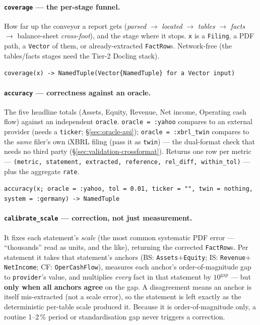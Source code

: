 \documentclass[11pt,a4paper]{report}
\newcommand{\sig}[1]{\medskip\noindent\texttt{#1}\par\medskip}
\begin{document}
\paragraph{\texttt{coverage} --- the per-stage funnel.} How far up the conveyor a report gets
(\emph{parsed} $\to$ \emph{located} $\to$ \emph{tables} $\to$ \emph{facts} $\to$ balance-sheet
\emph{cross-foot}), and the stage where it stops. \texttt{x} is a \texttt{Filing}, a PDF path, a
\texttt{Vector} of them, or already-extracted \texttt{FactRow}s. Network-free (the tables/facts stages need
the Tier-2 Docling stack).

\sig{coverage(x) -> NamedTuple\quad(\texttt{Vector\{NamedTuple\}} for a \texttt{Vector} input)}

\paragraph{\texttt{accuracy} --- correctness against an oracle.} The five headline totals (Assets, Equity,
Revenue, Net income, Operating cash flow) against an independent \texttt{oracle}. \texttt{oracle = :yahoo}
compares to an external provider (needs a \texttt{ticker}; \S\ref{sec:oracle-api}); \texttt{oracle =
:xbrl\_twin} compares to the \emph{same} filer's own iXBRL filing (pass it as \texttt{twin}) --- the
dual-format check that needs no third party (\S\ref{sec:validation-crossformat}). Returns one row per metric
--- \texttt{(metric, statement, extracted, reference, rel\_diff, within\_tol)} --- plus the aggregate
\texttt{rate}.

\sig{accuracy(x; oracle = :yahoo, tol = 0.01, ticker = "", twin = nothing, system = :germany) -> NamedTuple}

\paragraph{\texttt{calibrate\_scale} --- correction, not just measurement.} It fixes each statement's
\emph{scale} (the most common systematic PDF error --- ``thousands'' read as units, and the like), returning
the corrected \texttt{FactRow}s. Per statement it takes that statement's anchors (BS:
\texttt{Assets}$+$\texttt{Equity}; IS: \texttt{Revenue}$+$\texttt{NetIncome}; CF: \texttt{OperCashFlow}),
measures each anchor's order-of-magnitude gap to \texttt{provider}'s value, and multiplies \emph{every} fact
in that statement by $10^{\text{gap}}$ --- but \textbf{only when all anchors agree} on the gap. A
disagreement means an anchor is itself mis-extracted (not a scale error), so the statement is left exactly as
the deterministic per-table scale produced it. Because it is order-of-magnitude only, a routine 1--2\,\%
period or standardisation gap never triggers a correction.
\end{document}

